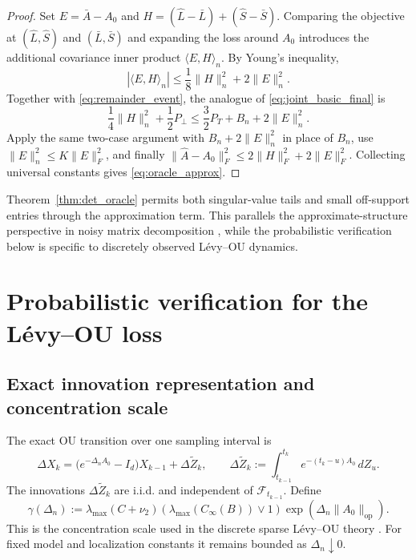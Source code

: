 \documentclass[12pt]{article}
\theoremstyle{definition}
\begin{document}
	\begin{proof}
		Set $E=\bar A-A_0$ and $H=(\widehat L-\bar L)+(\widehat S-\bar S)$. Comparing the objective at $(\widehat L,\widehat S)$ and $(\bar L,\bar S)$ and expanding the loss around $A_0$ introduces the additional covariance inner product $\langle E,H\rangle_n$. By Young's inequality,
		\[|\langle E,H\rangle_n| \le\frac18\|H\|_n^2+2\|E\|_n^2.\]
		Together with \eqref{eq:remainder_event}, the analogue of \eqref{eq:joint_basic_final} is
		\[\frac14\|H\|_n^2+\frac12P_\perp \le\frac32P_T+B_n+2\|E\|_n^2.\]
		Apply the same two-case argument with $B_n+2\|E\|_n^2$ in place of $B_n$, use $\|E\|_n^2\le K\|E\|_F^2$, and finally $\|\widehat A-A_0\|_F^2\le2\|H\|_F^2+2\|E\|_F^2$. Collecting universal constants gives \eqref{eq:oracle_approx}.
	\end{proof}
	
	Theorem~\ref{thm:det_oracle} permits both singular-value tails and small off-support entries through the approximation term. This parallels the approximate-structure perspective in noisy matrix decomposition \citep{AgarwalNegahbanWainwright2012}, while the probabilistic verification below is specific to discretely observed L\'evy--OU dynamics.
	
	\section{Probabilistic verification for the L\'evy--OU loss} \label{sec:probabilistic}
	
	\subsection{Exact innovation representation and concentration scale}
	
	The exact OU transition over one sampling interval is
	\begin{equation}
		\Delta X_k
		=\bigl(e^{-\Delta_nA_0}-I_d\bigr)X_{k-1}+\Delta\widetilde Z_k,
		\qquad \Delta\widetilde Z_k
		:=\int_{t_{k-1}}^{t_k}e^{-(t_k-u)A_0}\,dZ_u.\label{eq:innovation}\end{equation}
	The innovations $\Delta\widetilde Z_k$ are i.i.d. and independent of $\mathcal F_{t_{k-1}}$. Define
	\begin{equation}
		\gamma(\Delta_n) :=\lambda_{\max}(C+\nu_2) \left(\lambda_{\max}(C_\infty(B))\vee1\right)
		\exp\!\left(\Delta_n\|A_0\|_{\mathrm{op}}\right).
		\label{eq:gamma}
	\end{equation}
	This is the concentration scale used in the discrete sparse L\'evy--OU theory \citep[Theorem~3.1]{DexheimerJeszka2026}. For fixed model and localization constants it remains bounded as $\Delta_n\downarrow0$.
	
\end{document}
